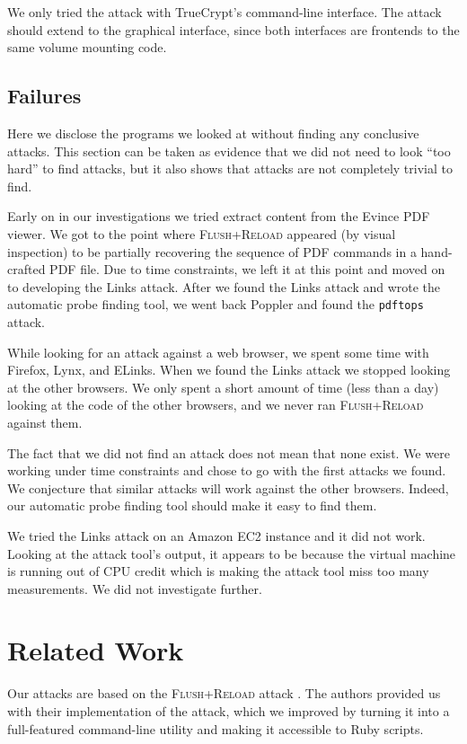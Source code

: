 \documentclass[letterpaper,twocolumn,10pt]{article}
\begin{document}
We only tried the attack with TrueCrypt's command-line interface. The attack
should extend to the graphical interface, since both interfaces are frontends to
the same volume mounting code. 

\subsection{Failures}
\label{sec:failures}

Here we disclose the programs we looked at without finding any conclusive
attacks. This section can be taken as evidence that we did not need to look
``too hard'' to find attacks, but it also shows that attacks are not completely
trivial to find.

Early on in our investigations we tried extract content from the Evince PDF
viewer. We got to the point where \textsc{Flush+Reload} appeared (by visual
inspection) to be partially recovering the sequence of PDF commands in
a hand-crafted PDF file. Due to time constraints, we left it at this point and
moved on to developing the Links attack. After we found the Links attack and
wrote the automatic probe finding tool, we went back Poppler and found the
\texttt{pdftops} attack.

While looking for an attack against a web browser, we spent some time with
Firefox, Lynx, and ELinks. When we found the Links attack we stopped looking at
the other browsers. We only spent a short amount of time (less than a day)
looking at the code of the other browsers, and we never ran
\textsc{Flush+Reload} against them.

The fact that we did not find an attack does not mean that none exist. We were
working under time constraints and chose to go with the first attacks we found.
We conjecture that similar attacks will work against the other browsers. Indeed,
our automatic probe finding tool should make it easy to find them.

We tried the Links attack on an Amazon EC2 instance and it did not work. Looking
at the attack tool's output, it appears to be because the virtual machine is
running out of CPU credit which is making the attack tool miss too many
measurements. We did not investigate further.

\section{Related Work}
\label{sec:relwork}

Our attacks are based on the \textsc{Flush+Reload} attack \cite{yarom2013flush}.
The authors provided us with their implementation of the attack, which we
improved by turning it into a full-featured command-line utility and making it
accessible to Ruby scripts.
\end{document}
